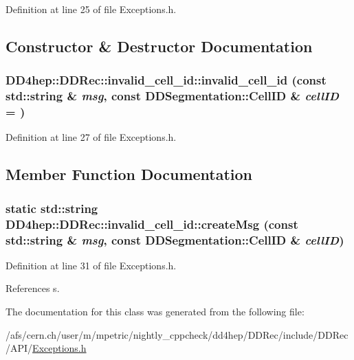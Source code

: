 Definition at line 25 of file Exceptions.h.

\subsection{Constructor \& Destructor Documentation}
\hypertarget{class_d_d4hep_1_1_d_d_rec_1_1invalid__cell__id_a242e8977aced3fb69db5bba5f876fe99}{
\subsubsection[{invalid\_\-cell\_\-id}]{\setlength{\rightskip}{0pt plus 5cm}DD4hep::DDRec::invalid\_\-cell\_\-id::invalid\_\-cell\_\-id (const std::string \& {\em msg}, \/  const {\bf DDSegmentation::CellID} \& {\em cellID} = {})}}
\label{class_d_d4hep_1_1_d_d_rec_1_1invalid__cell__id_a242e8977aced3fb69db5bba5f876fe99}


Definition at line 27 of file Exceptions.h.

\subsection{Member Function Documentation}
\hypertarget{class_d_d4hep_1_1_d_d_rec_1_1invalid__cell__id_a62d6a8a99f7edcfe1a506f90640d76a6}{
\subsubsection[{createMsg}]{\setlength{\rightskip}{0pt plus 5cm}static std::string DD4hep::DDRec::invalid\_\-cell\_\-id::createMsg (const std::string \& {\em msg}, \/  const {\bf DDSegmentation::CellID} \& {\em cellID})}}
\label{class_d_d4hep_1_1_d_d_rec_1_1invalid__cell__id_a62d6a8a99f7edcfe1a506f90640d76a6}


Definition at line 31 of file Exceptions.h.

References s.

The documentation for this class was generated from the following file:\begin{DoxyCompactItemize}
\item 
/afs/cern.ch/user/m/mpetric/nightly\_\-cppcheck/dd4hep/DDRec/include/DDRec/API/\hyperlink{_d_d_rec_2include_2_d_d_rec_2_a_p_i_2_exceptions_8h}{Exceptions.h}\end{DoxyCompactItemize}

